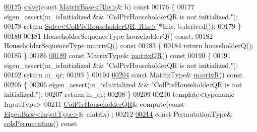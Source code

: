 \begin{DoxyCode}
\hyperlink{group___q_r___module_aaa9c4af89930ab3bb7612ed9ae33d3f5}{00175}     \hyperlink{group___q_r___module_aaa9c4af89930ab3bb7612ed9ae33d3f5}{solve}(\textcolor{keyword}{const} \hyperlink{group___core___module_class_eigen_1_1_matrix_base}{MatrixBase<Rhs>}& b)\textcolor{keyword}{ const}
00176 \textcolor{keyword}{    }\{
00177       eigen\_assert(m\_isInitialized && \textcolor{stringliteral}{"ColPivHouseholderQR is not initialized."});
00178       \textcolor{keywordflow}{return} \hyperlink{group___core___module_class_eigen_1_1_solve}{Solve<ColPivHouseholderQR, Rhs>}(*\textcolor{keyword}{this}, b.derived());
00179     \}
00180 
00181     HouseholderSequenceType householderQ() \textcolor{keyword}{const};
00182     HouseholderSequenceType matrixQ()\textcolor{keyword}{ const}
00183 \textcolor{keyword}{    }\{
00184       \textcolor{keywordflow}{return} householderQ();
00185     \}
00186 
\hyperlink{group___q_r___module_aa572ac050c8d4fadd4f08a87f6b1e62b}{00189}     \textcolor{keyword}{const} MatrixType& \hyperlink{group___q_r___module_aa572ac050c8d4fadd4f08a87f6b1e62b}{matrixQR}()\textcolor{keyword}{ const}
00190 \textcolor{keyword}{    }\{
00191       eigen\_assert(m\_isInitialized && \textcolor{stringliteral}{"ColPivHouseholderQR is not initialized."});
00192       \textcolor{keywordflow}{return} m\_qr;
00193     \}
00194 
\hyperlink{group___q_r___module_a44c534d47bde6b67ce4b5247d142ef30}{00204}     \textcolor{keyword}{const} MatrixType& \hyperlink{group___q_r___module_a44c534d47bde6b67ce4b5247d142ef30}{matrixR}()\textcolor{keyword}{ const}
00205 \textcolor{keyword}{    }\{
00206       eigen\_assert(m\_isInitialized && \textcolor{stringliteral}{"ColPivHouseholderQR is not initialized."});
00207       \textcolor{keywordflow}{return} m\_qr;
00208     \}
00209 
00210     \textcolor{keyword}{template}<\textcolor{keyword}{typename} InputType>
00211     \hyperlink{group___q_r___module_class_eigen_1_1_col_piv_householder_q_r}{ColPivHouseholderQR}& compute(\textcolor{keyword}{const} \hyperlink{group___core___module_struct_eigen_1_1_eigen_base}{EigenBase<InputType>}& matrix)
      ;
00212 
\hyperlink{group___q_r___module_ab6ad43e6a6fb75726eae0d5499948f4a}{00214}     \textcolor{keyword}{const} PermutationType& \hyperlink{group___q_r___module_ab6ad43e6a6fb75726eae0d5499948f4a}{colsPermutation}()\textcolor{keyword}{ const}

\end{DoxyCode}
